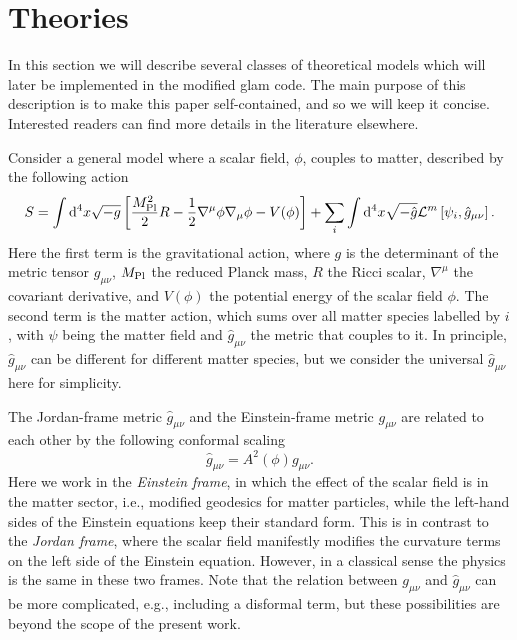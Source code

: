 
\section{Theories}
\label{sec:theories}

In this section we will describe several classes of theoretical models which will later be implemented in the modified {\sc glam} code. The main purpose of this description is to make this paper self-contained, and so we will keep it concise. Interested readers can find more details in the literature elsewhere. 

Consider a general model where a scalar field, $\phi$, couples to matter, described by the following action
\begin{equation}
    S = \int{\rm d}^4x\sqrt{-g}\left[\frac{M^2_{\rm Pl}}{2}R - \frac{1}{2}\nabla^\mu\phi\nabla_\mu\phi-V(\phi)\right] + \sum_i\int{\rm d}^4x\sqrt{-\hat{g}}\mathcal{L}^m\left[\psi_i,\hat{g}_{\mu\nu}\right].
\end{equation}
Here the first term is the gravitational action, where $g$ is the determinant of the metric tensor $g_{\mu\nu}$, $M_{\rm Pl}$ the reduced Planck mass, $R$ the Ricci scalar, $\nabla^\mu$ the covariant derivative, and $V(\phi)$ the potential energy of the scalar field $\phi$. The second term is the matter action, which sums over all matter species labelled by $i$, with $\psi$ being the matter field and $\hat{g}_{\mu\nu}$ the metric that couples to it. In principle, $\hat{g}_{\mu\nu}$ can be different for different matter species, but we consider the universal $\hat{g}_{\mu\nu}$ here for simplicity. 

The Jordan-frame metric $\hat{g}_{\mu\nu}$ and the Einstein-frame metric $g_{\mu\nu}$ are related to each other by the following conformal scaling
\begin{equation}\label{eq:conformal_metric}
    \hat{g}_{\mu\nu} = A^2(\phi)g_{\mu\nu}.
\end{equation}
Here we work in the \textit{Einstein frame}, in which the effect of the scalar field is in the matter sector, i.e., modified geodesics for matter particles, while the left-hand sides of the Einstein equations keep their standard form. This is in contrast to the \textit{Jordan frame}, where the scalar field manifestly modifies the curvature terms on the left side of the Einstein equation. However, in a classical sense the physics is the same in these two frames. Note that the relation between $g_{\mu\nu}$ and $\hat{g}_{\mu\nu}$ can be more complicated, e.g., including a disformal term, but these possibilities are beyond the scope of the present work.

